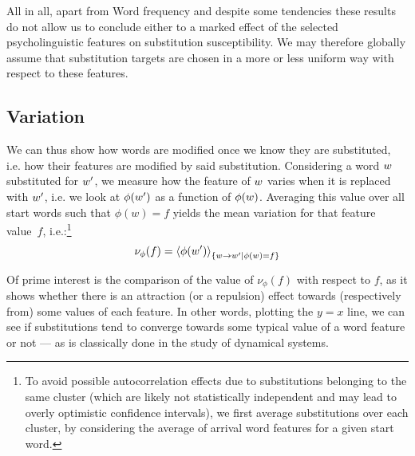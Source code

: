 All in all, apart from Word frequency and despite some tendencies these results do not allow us to conclude either to a marked effect %
of the selected psycholinguistic features on substitution susceptibility.
We may therefore globally assume that substitution targets are chosen in a more or less uniform way with respect to these features.


\subsection{Variation}

We can thus show how words are modified once we know they are substituted, \hbox{i.e.} how their features are modified by said substitution.
Considering a word $w$ substituted for $w'$, we measure how the feature of $w$ varies when it is replaced with $w'$, i.e. we look at $\phi(w')$ as a function of $\phi(w)$. 
Averaging this value over all start words such that $\phi(w) = f$ yields the mean variation for that feature value~$f$, i.e.:\footnote{To avoid possible autocorrelation effects due to substitutions belonging to the same cluster (which are likely not statistically independent and may lead to overly optimistic confidence intervals), we first average substitutions over each cluster, by considering the average of arrival word features for a given start word.}
$$\nu_{\phi}(f) = \left<\phi(w')\right>_{\left\lbrace w\rightarrow w' | \phi(w) = f \right\rbrace}$$

Of prime interest is the comparison of the value of $\nu_{\phi}(f)$ with respect to $f$, as it shows whether there is an attraction (or a repulsion) effect towards (respectively from) some values of each feature.
In other words, plotting the $y=x$ line, we can see if substitutions tend to converge towards some typical value of a word feature or not --- as is classically done in the study of dynamical systems.

